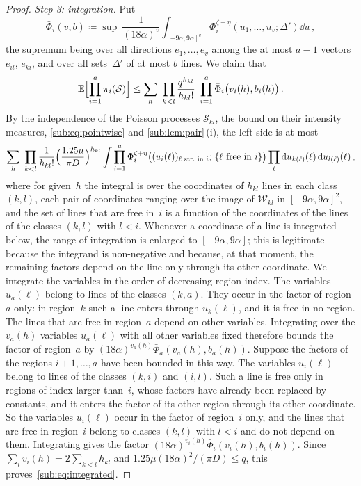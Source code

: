 \documentclass[11pt,letterpaper]{article}
\newcommand{\cS}{\mathcal S}
\newcommand{\cW}{\mathcal W}
\begin{document}
\begin{proof}
\emph{Step 3: integration.} Put
\begin{equation*}
  \bar\Phi_i(v,b)\coloneqq\sup\ \frac1{(18\alpha)^{v}}\int_{[-9\alpha,9\alpha]^{v}}\Phi_i^{\zeta+\eta}(u_1,\dots,u_v;\Delta')\dd u\,,
\end{equation*}
the supremum being over all directions $e_1,\dots,e_v$ among the at most $a-1$ vectors $e_{il}$, $e_{ki}$, and over all sets~$\Delta'$ of at most $b$ lines. We claim that
\begin{equation}
\label{sub:eq:integrated}
  \E\Bigl[\prod_{i=1}^a\pi_i(\cS)\Bigr]\le\sum_h\ \prod_{k<l}\frac{q^{h_{kl}}}{h_{kl}!}\ \prod_{i=1}^a\bar\Phi_i\bigl(v_i(h),b_i(h)\bigr)\,.
\end{equation}
By the independence of the Poisson processes $\cS_{kl}$, the bound on their intensity measures, \eqref{sub:eq:pointwise} and \cref{sub:lem:pair}\,(i), the left side is at most
\begin{equation*}
  \sum_h\ \prod_{k<l}\frac{1}{h_{kl}!}\Bigl(\frac{1.25\mu}{\pi D}\Bigr)^{h_{kl}}\int\prod_{i=1}^a\Phi_i^{\zeta+\eta}\bigl((u_i(\ell))_{\ell\text{ str.\ in }i};\,\{\ell\text{ free in }i\}\bigr)\prod_{\ell}\d u_{k(\ell)}(\ell)\,\d u_{l(\ell)}(\ell)\,,
\end{equation*}
where for given~$h$ the integral is over the coordinates of $h_{kl}$ lines in each class $(k,l)$, each pair of coordinates ranging over the image of $\cW_{kl}$ in $[-9\alpha,9\alpha]^2$, and the set of lines that are free in~$i$ is a function of the coordinates of the lines of the classes $(k,l)$ with $l<i$. Whenever a coordinate of a line is integrated below, the range of integration is enlarged to $[-9\alpha,9\alpha]$; this is legitimate because the integrand is non-negative and because, at that moment, the remaining factors depend on the line only through its other coordinate. We integrate the variables in the order of decreasing region index. The variables $u_a(\ell)$ belong to lines of the classes $(k,a)$. They occur in the factor of region~$a$ only: in region~$k$ such a line enters through $u_k(\ell)$, and it is free in no region. The lines that are free in region~$a$ depend on other variables. Integrating over the $v_a(h)$ variables $u_a(\ell)$ with all other variables fixed therefore bounds the factor of region~$a$ by $(18\alpha)^{v_a(h)}\bar\Phi_a(v_a(h),b_a(h))$. Suppose the factors of the regions $i+1,\dots,a$ have been bounded in this way. The variables $u_i(\ell)$ belong to lines of the classes $(k,i)$ and $(i,l)$. Such a line is free only in regions of index larger than~$i$, whose factors have already been replaced by constants, and it enters the factor of its other region through its other coordinate. So the variables $u_i(\ell)$ occur in the factor of region~$i$ only, and the lines that are free in region~$i$ belong to classes $(k,l)$ with $l<i$ and do not depend on them. Integrating gives the factor $(18\alpha)^{v_i(h)}\bar\Phi_i(v_i(h),b_i(h))$. Since $\sum_iv_i(h)=2\sum_{k<l}h_{kl}$ and $1.25\mu(18\alpha)^2/(\pi D)\le q$, this proves~\eqref{sub:eq:integrated}.


\end{proof}
\end{document}

